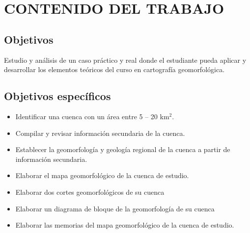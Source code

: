\documentclass[twoside,11pt,]{article}
\begin{document}
\section{CONTENIDO DEL TRABAJO}
\subsection{Objetivos} 
Estudio y análisis de un caso práctico y real donde el estudiante pueda aplicar y desarrollar los elementos teóricos del curso en cartografía geomorfológica.
\subsection*{Objetivos específicos}
\begin{itemize}
\item Identificar una cuenca con un área entre 5 – 20 km$^2$.
\item Compilar y revisar información secundaria de la cuenca.
\item Establecer la geomorfología y geología regional de la cuenca a partir de información secundaria.
\item Elaborar el mapa geomorfológico de la cuenca de estudio.
\item Elaborar dos cortes geomorfológicos de su cuenca
\item Elaborar un diagrama de bloque de la geomorfología de su cuenca
\item Elaborar las memorias del mapa geomorfológico de la cuenca de estudio.
\end{itemize}
\end{document}
